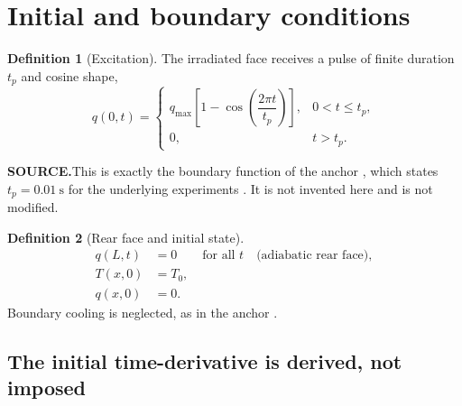 \documentclass[11pt,a4paper]{article}
\theoremstyle{definition}
\newtheorem{definitionx}{Definition}[section]
\newcommand{\source}[1]{\par\smallskip\noindent\textbf{SOURCE.}\enspace #1\par}
\begin{document}
\section{Initial and boundary conditions}
\label{sec:icbc}

\begin{definitionx}[Excitation]
\label{def:pulse}
The irradiated face receives a pulse of finite duration $t_{p}$ and cosine
shape,
\begin{equation}
  q(0,t) =
  \begin{cases}
    q_{\max}\left[1-\cos\!\left(\dfrac{2\pi t}{t_{p}}\right)\right],
      & 0 < t \leq t_{p}, \\[2ex]
    0, & t > t_{p} .
  \end{cases}
  \label{eq:pulse-dim}
\end{equation}
\end{definitionx}

\source{This is exactly the boundary function of the anchor
\cite{Kovacs2018}, which states $t_{p}=\SI{0.01}{\second}$ for the underlying
experiments \cite{Both2016,Van2017}. It is not invented here and is not
modified.}

\begin{definitionx}[Rear face and initial state]
\label{def:bcic}
\begin{align}
  q(L,t) &= 0 \qquad \text{for all } t \quad
            \text{(adiabatic rear face)} ,
  \label{eq:bc-rear-dim}\\
  T(x,0) &= T_{0} ,
  \label{eq:ic-T}\\
  q(x,0) &= 0 .
  \label{eq:ic-q}
\end{align}
Boundary cooling is neglected, as in the anchor \cite{Kovacs2018}.
\end{definitionx}

\subsection{The initial time-derivative is derived, not imposed}
\label{sec:ic-derived}
\end{document}
